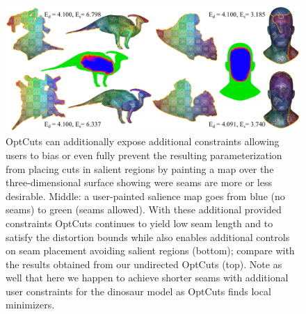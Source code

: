 \begin{figure}[t]
\centering
\includegraphics[width=\linewidth]{fig/regional_user.png}
\vspace{-0.3cm}
\caption{OptCuts can additionally expose additional constraints allowing 
users to bias or even fully prevent the resulting parameterization from placing cuts in salient regions by painting a map over the three-dimensional surface showing were seams are more or less desirable. 
Middle: a user-painted salience map goes from blue (no seams) to green (seams allowed). With these additional provided constraints OptCuts continues to yield low seam length and to satisfy the distortion bounds while also enables additional controls on seam placement avoiding salient regions (bottom); compare with the results obtained from our undirected OptCuts (top). Note as well that here we happen to achieve shorter seams with additional user constraints for the dinosaur model as OptCuts finds local minimizers.}
\vspace{-0.3cm}
\label{fig:regional_seam_placement}
\end{figure}



